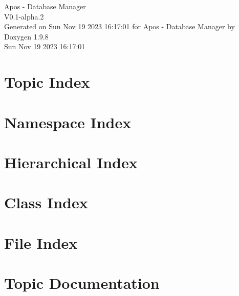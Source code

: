 \documentclass[twoside]{book}
\newcommand{\+}{\discretionary{\mbox{\scriptsize$\hookleftarrow$}}{}{}}
\newcommand{\clearemptydoublepage}{%
    \newpage{\pagestyle{empty}\cleardoublepage}%
  }
\begin{document}
  \raggedbottom
    \hypersetup{pageanchor=false,
                bookmarksnumbered=true,
                pdfencoding=unicode
               }
  \begin{titlepage}
  \vspace*{7cm}
  \begin{center}%
  {\Large Apos -\/ Database Manager}\\
  [1ex]\large V0.\+1-\/alpha.\+2 \\
  \vspace*{1cm}
  {\large Generated on Sun Nov 19 2023 16\+:17\+:01 for Apos -\/ Database Manager by Doxygen 1.9.8}\\
    \vspace*{0.5cm}
    {\small Sun Nov 19 2023 16:17:01}
  \end{center}
  \end{titlepage}
  \clearemptydoublepage
  \tableofcontents
  \clearemptydoublepage
  \hypersetup{pageanchor=true}


\chapter{Topic Index}

\chapter{Namespace Index}

\chapter{Hierarchical Index}

\chapter{Class Index}

\chapter{File Index}

\chapter{Topic Documentation}









\end{document}

